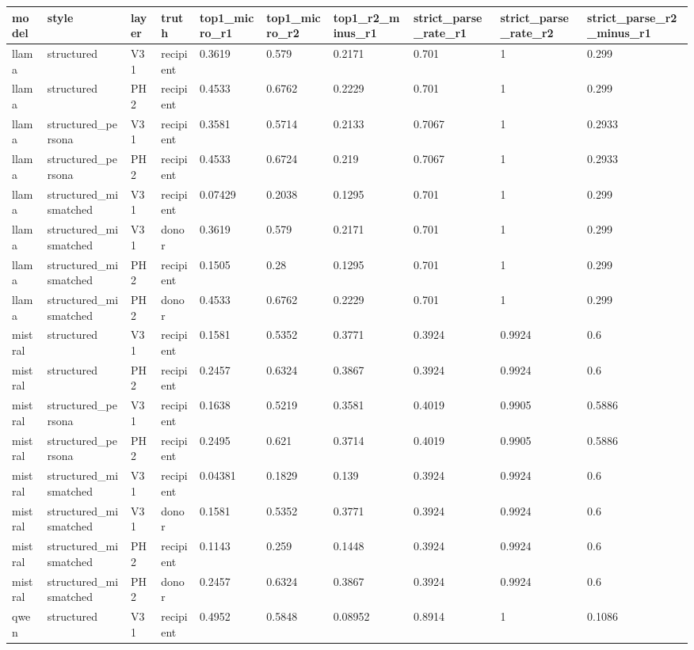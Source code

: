 \begin{tabular}{llllllllll}
\toprule
model & style & layer & truth & top1\_micro\_r1 & top1\_micro\_r2 & top1\_r2\_minus\_r1 & strict\_parse\_rate\_r1 & strict\_parse\_rate\_r2 & strict\_parse\_r2\_minus\_r1 \\
\midrule
llama & structured & V31 & recipient & 0.3619 & 0.579 & 0.2171 & 0.701 & 1 & 0.299 \\
llama & structured & PH2 & recipient & 0.4533 & 0.6762 & 0.2229 & 0.701 & 1 & 0.299 \\
llama & structured\_persona & V31 & recipient & 0.3581 & 0.5714 & 0.2133 & 0.7067 & 1 & 0.2933 \\
llama & structured\_persona & PH2 & recipient & 0.4533 & 0.6724 & 0.219 & 0.7067 & 1 & 0.2933 \\
llama & structured\_mismatched & V31 & recipient & 0.07429 & 0.2038 & 0.1295 & 0.701 & 1 & 0.299 \\
llama & structured\_mismatched & V31 & donor & 0.3619 & 0.579 & 0.2171 & 0.701 & 1 & 0.299 \\
llama & structured\_mismatched & PH2 & recipient & 0.1505 & 0.28 & 0.1295 & 0.701 & 1 & 0.299 \\
llama & structured\_mismatched & PH2 & donor & 0.4533 & 0.6762 & 0.2229 & 0.701 & 1 & 0.299 \\
mistral & structured & V31 & recipient & 0.1581 & 0.5352 & 0.3771 & 0.3924 & 0.9924 & 0.6 \\
mistral & structured & PH2 & recipient & 0.2457 & 0.6324 & 0.3867 & 0.3924 & 0.9924 & 0.6 \\
mistral & structured\_persona & V31 & recipient & 0.1638 & 0.5219 & 0.3581 & 0.4019 & 0.9905 & 0.5886 \\
mistral & structured\_persona & PH2 & recipient & 0.2495 & 0.621 & 0.3714 & 0.4019 & 0.9905 & 0.5886 \\
mistral & structured\_mismatched & V31 & recipient & 0.04381 & 0.1829 & 0.139 & 0.3924 & 0.9924 & 0.6 \\
mistral & structured\_mismatched & V31 & donor & 0.1581 & 0.5352 & 0.3771 & 0.3924 & 0.9924 & 0.6 \\
mistral & structured\_mismatched & PH2 & recipient & 0.1143 & 0.259 & 0.1448 & 0.3924 & 0.9924 & 0.6 \\
mistral & structured\_mismatched & PH2 & donor & 0.2457 & 0.6324 & 0.3867 & 0.3924 & 0.9924 & 0.6 \\
qwen & structured & V31 & recipient & 0.4952 & 0.5848 & 0.08952 & 0.8914 & 1 & 0.1086 \\

\end{tabular}
